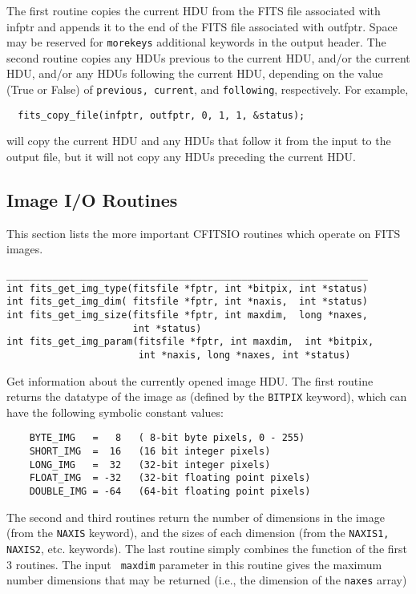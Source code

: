 \documentclass[11pt]{article}
\begin{document}
The first routine copies the current HDU from the FITS file associated
with infptr and appends it to the end of the FITS file associated with
outfptr.  Space may be reserved for {\tt morekeys} additional keywords
in the output header.   The second routine copies any HDUs previous
to the current HDU, and/or the current HDU, and/or any HDUs following the
current HDU, depending on the value (True or False) of {\tt previous,
current}, and {\tt following}, respectively.  For example,
\begin{verbatim}
  fits_copy_file(infptr, outfptr, 0, 1, 1, &status);
\end{verbatim}
will copy the current HDU and any HDUs that follow it from the input
to the output file, but it will not copy any HDUs preceding the 
current HDU.


\newpage
\subsection{Image I/O Routines}

This section lists the more important CFITSIO routines which operate on
FITS images.

\begin{verbatim}
_______________________________________________________________
int fits_get_img_type(fitsfile *fptr, int *bitpix, int *status)
int fits_get_img_dim( fitsfile *fptr, int *naxis,  int *status)
int fits_get_img_size(fitsfile *fptr, int maxdim,  long *naxes,
                      int *status)
int fits_get_img_param(fitsfile *fptr, int maxdim,  int *bitpix,
                       int *naxis, long *naxes, int *status)
\end{verbatim}

Get information about the currently opened image HDU. The first routine
returns the datatype of the image as (defined by the {\tt BITPIX}
keyword), which can have the following symbolic constant values: 
\begin{verbatim}
    BYTE_IMG   =   8   ( 8-bit byte pixels, 0 - 255)
    SHORT_IMG  =  16   (16 bit integer pixels)
    LONG_IMG   =  32   (32-bit integer pixels)
    FLOAT_IMG  = -32   (32-bit floating point pixels)
    DOUBLE_IMG = -64   (64-bit floating point pixels)
\end{verbatim}

The second and third routines return the number of dimensions in the
image (from the {\tt NAXIS} keyword), and the sizes of each dimension
(from the {\tt NAXIS1, NAXIS2}, etc. keywords).  The last routine
simply combines the function of the first 3 routines.  The input {\tt
maxdim} parameter in this routine gives the maximum number dimensions
that may be returned (i.e., the dimension of the {\tt naxes}
array)
\end{document}
